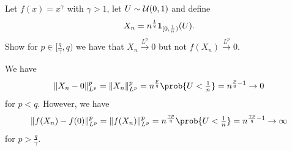 
\begin{exercise}[subtitle={Counterexample \(L^p\) continuous mapping \Coffeecup}]
    Let \(f(x) = x^\gamma\) with \(\gamma >1\), let \(U\sim \mathcal{U}(0,1)\) and define
    \[
        X_n = n^{\frac1q} \ind{[0, \frac1n)}(U).
    \]
    Show for \(p\in [\frac{q}\gamma, q)\) we have that \(X_n \overset{L^p}\to 0\)
    but not \(f(X_n) \overset{L^p}\to 0\).
\end{exercise}

\begin{solution}
    We have
    \[
        \norm{X_n-0}_{L^p}^p = \norm{X_n}_{L^p}^p = n^{\frac{p}{q}} \prob{U < \tfrac1n} = n^{\frac{p}{q}-1} \to 0
    \]
    for \(p < q\). However, we have
    \[
        \norm{f(X_n)- f(0)}_{L^p}^p = \norm{f(X_n)}_{L^p}^p = n^{\frac{\gamma p}{q}} \prob{U < \tfrac1n} = n^{\frac{\gamma p}{q}-1} \to \infty
    \]
    for \(p > \frac{q}\gamma\).    
\end{solution}
